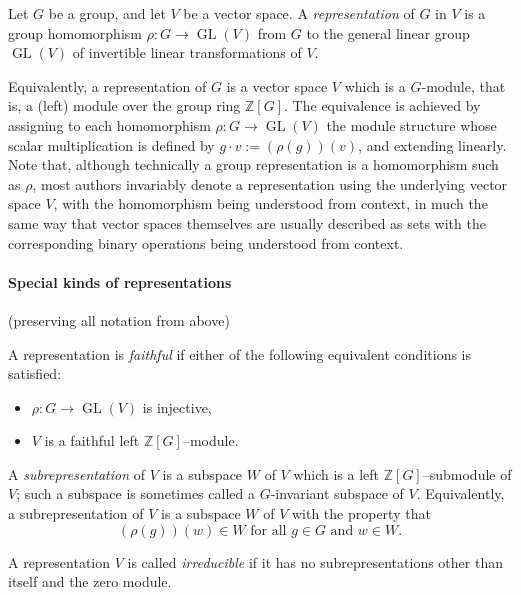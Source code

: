\documentclass[12pt]{article}
\begin{document}
Let $G$ be a group, and let $V$ be a vector space. A \emph{representation} of $G$ in $V$ is a group homomorphism $\rho\colon G \to \operatorname{GL}(V)$ from $G$ to the general linear group $\operatorname{GL}(V)$ of invertible linear transformations of $V$.

Equivalently, a representation of $G$ is a vector space $V$ which is a $G$-module, that is, a (left) module over the group ring $\mathbb{Z}[G]$. The equivalence is achieved by assigning to each homomorphism $\rho\colon G \to \operatorname{GL}(V)$ the module structure whose scalar multiplication is defined by $g \cdot v := (\rho(g))(v)$, and extending linearly. Note that, although technically a group representation is a homomorphism such as $\rho$, most authors invariably denote a representation using the underlying vector space $V$, with the homomorphism being understood from context, in much the same way that vector spaces themselves are usually described as sets with the corresponding binary operations being understood from context.

\paragraph{Special kinds of representations}

(preserving all notation from above)

A representation is \emph{faithful} if either of the following equivalent conditions is satisfied:
\begin{itemize}
\item $\rho\colon G \to \operatorname{GL}(V)$ is injective,
\item $V$ is a faithful left $\mathbb{Z}[G]$--module.
\end{itemize}

A \emph{subrepresentation} of $V$ is a subspace $W$ of $V$ which is a left $\mathbb{Z}[G]$--submodule of $V$;
 such a subspace is sometimes called a $G$-invariant subspace of $V$. Equivalently, a subrepresentation of $V$ is a subspace $W$ of $V$ with the property that
$$
(\rho(g))(w) \in W \text{ for all } g \in G \text{ and } w \in W.
$$

A representation $V$ is called {\em irreducible} if it has no subrepresentations other than itself and the zero module.
\end{document}
